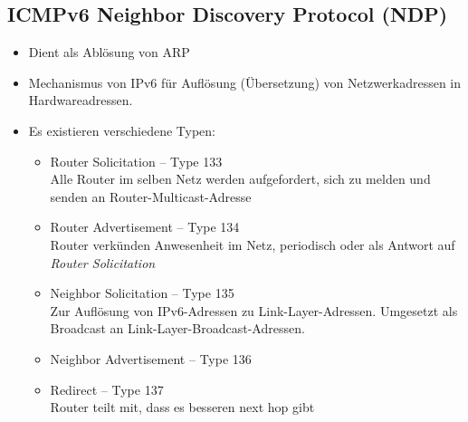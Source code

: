 \documentclass{article} %
\begin{document}
\subsection{ICMPv6 Neighbor Discovery Protocol (NDP)} 
\begin{itemize}
	\item Dient als Ablösung von ARP
	\item Mechanismus von IPv6 für Auflösung (Übersetzung) von Netzwerkadressen in Hardwareadressen\cite{rfc4861}.
	\item Es existieren verschiedene Typen:
		\begin{itemize}
		\item Router Solicitation – Type 133 \\
		Alle Router im selben Netz werden aufgefordert, sich zu melden und senden an Router-Multicast-Adresse 
		\item Router Advertisement – Type 134 \\
		Router verkünden Anwesenheit im Netz, periodisch oder als Antwort auf \textit{Router Solicitation} 		
		\item Neighbor Solicitation – Type 135 \\
		Zur Auflösung von IPv6-Adressen zu Link-Layer-Adressen. Umgesetzt als Broadcast an Link-Layer-Broadcast-Adressen.
		\item Neighbor Advertisement – Type 136 
		\item Redirect – Type 137 \\
		Router teilt mit, dass es besseren next hop gibt 
		\end{itemize}
	
	
\end{itemize}
\end{document}
